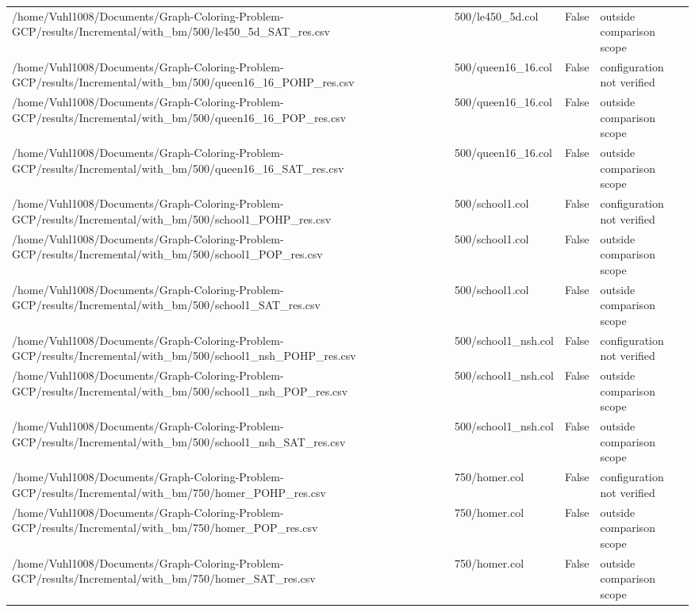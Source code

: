 \begin{table}[htbp]
\begin{tabular}{llll}
/home/Vuhl1008/Documents/Graph-Coloring-Problem-GCP/results/Incremental/with\_bm/500/le450\_5d\_SAT\_res.csv & 500/le450\_5d.col & False & outside comparison scope \\
/home/Vuhl1008/Documents/Graph-Coloring-Problem-GCP/results/Incremental/with\_bm/500/queen16\_16\_POHP\_res.csv & 500/queen16\_16.col & False & configuration not verified \\
/home/Vuhl1008/Documents/Graph-Coloring-Problem-GCP/results/Incremental/with\_bm/500/queen16\_16\_POP\_res.csv & 500/queen16\_16.col & False & outside comparison scope \\
/home/Vuhl1008/Documents/Graph-Coloring-Problem-GCP/results/Incremental/with\_bm/500/queen16\_16\_SAT\_res.csv & 500/queen16\_16.col & False & outside comparison scope \\
/home/Vuhl1008/Documents/Graph-Coloring-Problem-GCP/results/Incremental/with\_bm/500/school1\_POHP\_res.csv & 500/school1.col & False & configuration not verified \\
/home/Vuhl1008/Documents/Graph-Coloring-Problem-GCP/results/Incremental/with\_bm/500/school1\_POP\_res.csv & 500/school1.col & False & outside comparison scope \\
/home/Vuhl1008/Documents/Graph-Coloring-Problem-GCP/results/Incremental/with\_bm/500/school1\_SAT\_res.csv & 500/school1.col & False & outside comparison scope \\
/home/Vuhl1008/Documents/Graph-Coloring-Problem-GCP/results/Incremental/with\_bm/500/school1\_nsh\_POHP\_res.csv & 500/school1\_nsh.col & False & configuration not verified \\
/home/Vuhl1008/Documents/Graph-Coloring-Problem-GCP/results/Incremental/with\_bm/500/school1\_nsh\_POP\_res.csv & 500/school1\_nsh.col & False & outside comparison scope \\
/home/Vuhl1008/Documents/Graph-Coloring-Problem-GCP/results/Incremental/with\_bm/500/school1\_nsh\_SAT\_res.csv & 500/school1\_nsh.col & False & outside comparison scope \\
/home/Vuhl1008/Documents/Graph-Coloring-Problem-GCP/results/Incremental/with\_bm/750/homer\_POHP\_res.csv & 750/homer.col & False & configuration not verified \\
/home/Vuhl1008/Documents/Graph-Coloring-Problem-GCP/results/Incremental/with\_bm/750/homer\_POP\_res.csv & 750/homer.col & False & outside comparison scope \\
/home/Vuhl1008/Documents/Graph-Coloring-Problem-GCP/results/Incremental/with\_bm/750/homer\_SAT\_res.csv & 750/homer.col & False & outside comparison scope \\

\end{tabular}
\end{table}
